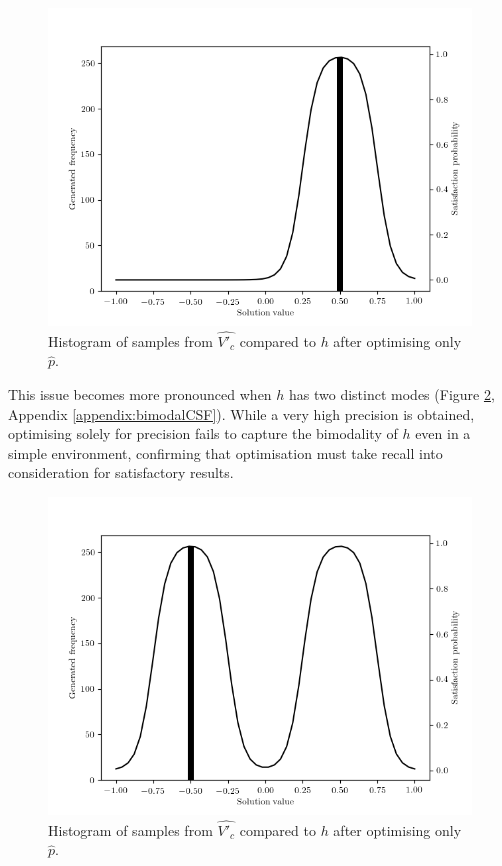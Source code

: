 \documentclass[../../main.tex]{subfiles}
\begin{document}
\begin{figure}[H]
    \begin{center}
    \includegraphics[width=\textwidth]{sigmoidBumpHistogram}
    \caption[Unimodal samples from arbitrary CSF]{
        Histogram of samples from $\hat{V'_c}$ compared to $h$ after optimising only $\hat{p}$.
    }
    \label{fig:sigmoidBumpHistogram}
    \end{center}
\end{figure}
This issue becomes more pronounced when $h$ has two distinct modes (Figure \ref{fig:sigmoidBumpHistogramBimodal}, Appendix \ref{appendix:bimodalCSF}).
While a very high precision is obtained, optimising solely for precision fails to capture the bimodality of $h$ even in a simple environment, confirming that optimisation must take recall into consideration for satisfactory results.
\begin{figure}[H]
    \begin{center}
    \includegraphics[width=\textwidth]{sigmoidBumpHistogramBimodal}
    \caption[Bimodal samples from arbitrary CSF]{
        Histogram of samples from $\hat{V'_c}$ compared to $h$ after optimising only $\hat{p}$.
    }
    \label{fig:sigmoidBumpHistogramBimodal}
    \end{center}
\end{figure}
\end{document}
